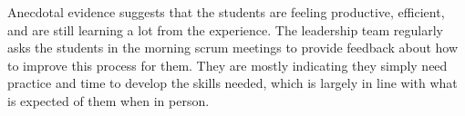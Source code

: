 Anecdotal evidence suggests that the students are feeling productive, efficient, and are still learning a lot from the experience. The leadership team regularly asks the students in the morning scrum meetings to provide feedback about how to improve this process for them. They are mostly indicating they simply need practice and time to develop the skills needed, which is largely in line with what is expected of them when in person.
